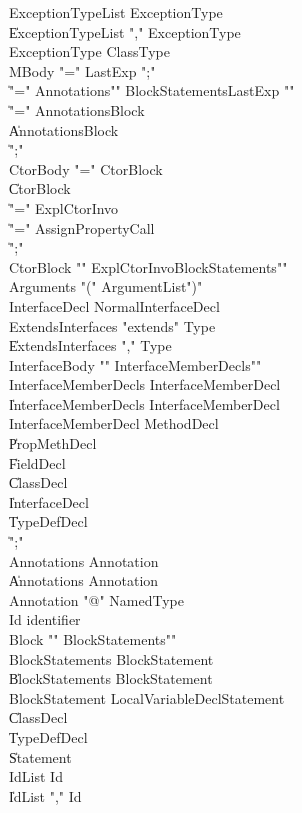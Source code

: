 {\begin{grammar}

 ExceptionTypeList  \: ExceptionType\\
    \| ExceptionTypeList \xcd"," ExceptionType\\
 ExceptionType  \: ClassType\\
 MBody  \: \xcd"=" LastExp \xcd";"\\
    \| \xcd"=" Annotations\opt \xcd"{" BlockStatements\opt LastExp \xcd"}"\\
    \| \xcd"=" Annotations\opt Block\\
    \| Annotations\opt Block\\
    \| \xcd";"\\
 CtorBody  \: \xcd"=" CtorBlock\\
    \| CtorBlock\\
    \| \xcd"=" ExplCtorInvo\\
    \| \xcd"=" AssignPropertyCall\\
    \| \xcd";"\\
 CtorBlock  \: \xcd"{" ExplCtorInvo\opt BlockStatements\opt \xcd"}"\\
 Arguments  \: \xcd"(" ArgumentList\opt \xcd")"\\
 InterfaceDecl  \: NormalInterfaceDecl\\
 ExtendsInterfaces  \: \xcd"extends" Type\\
    \| ExtendsInterfaces \xcd"," Type\\
 InterfaceBody  \: \xcd"{" InterfaceMemberDecls\opt \xcd"}"\\
 InterfaceMemberDecls  \: InterfaceMemberDecl\\
    \| InterfaceMemberDecls InterfaceMemberDecl\\
 InterfaceMemberDecl  \: MethodDecl\\
    \| PropMethDecl\\
    \| FieldDecl\\
    \| ClassDecl\\
    \| InterfaceDecl\\
    \| TypeDefDecl\\
    \| \xcd";"\\
 Annotations  \: Annotation\\
    \| Annotations Annotation\\
 Annotation  \: \xcd"@" NamedType\\
 Id  \: identifier\\
 Block  \: \xcd"{" BlockStatements\opt \xcd"}"\\
 BlockStatements  \: BlockStatement\\
    \| BlockStatements BlockStatement\\
 BlockStatement  \: LocalVariableDeclStatement\\
    \| ClassDecl\\
    \| TypeDefDecl\\
    \| Statement\\
 IdList  \: Id\\
    \| IdList \xcd"," Id\\
\end{grammar}

}
